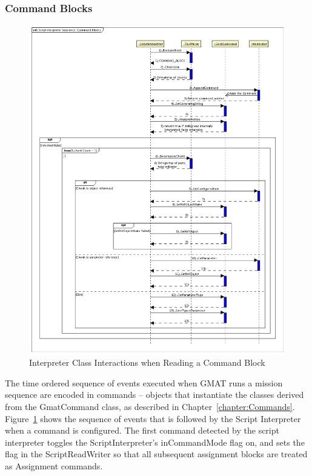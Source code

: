 \subsubsection{\label{section:ParsingCommandBlocks}Command Blocks}

\begin{figure}
\begin{center}
\includegraphics[400,512]{Images/ScriptInterpreterSequenceCommandBlocks.png}
\caption{\label{figure:InterpreterReadInteractionsCommandBlock}Interpreter Class Interactions when
Reading a Command Block}
\end{center}
\end{figure}

The time ordered sequence of events executed when GMAT runs a mission sequence are encoded in
commands -- objects that instantiate the classes derived from the GmatCommand class, as described
in Chapter~\ref{chapter:Commands}.  Figure~\ref{figure:InterpreterReadInteractionsCommandBlock}
shows the sequence of events that is followed by the Script Interpreter when a command is
configured.  The first command detected by the script interpreter toggles the ScriptInterpreter's
inCommandMode flag on, and sets the flag in the ScriptReadWriter so that all subsequent assignment
blocks are treated as Assignment commands.

